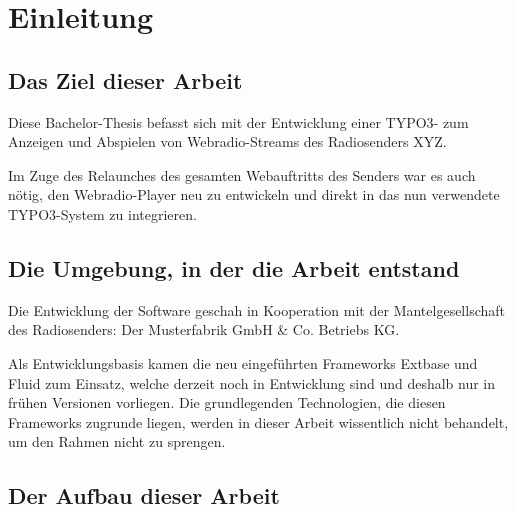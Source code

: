 
\chapter{Einleitung}
\label{cha:Einleitung}


\section{Das Ziel dieser Arbeit}
\label{sec:ZielDerArbeit}

Diese Bachelor-Thesis befasst sich mit der Entwicklung einer TYPO3- zum Anzeigen und Abspielen von Webradio-Streams des Radiosenders XYZ.

Im Zuge des Relaunches des gesamten Webauftritts des Senders war es auch n\"otig, den Webradio-Player neu zu entwickeln und direkt in das nun verwendete TYPO3-System zu integrieren.


\section{Die Umgebung, in der die Arbeit entstand}
\label{sec:EntstehungsUmgebungArbeit}

Die Entwicklung der Software geschah in Kooperation mit der Mantelgesellschaft des Radiosenders: Der Musterfabrik GmbH \& Co. Betriebs KG.

Als Entwicklungsbasis kamen die neu eingef\"uhrten Frameworks Extbase und Fluid zum Einsatz, welche derzeit noch in Entwicklung sind und deshalb nur in fr\"uhen Versionen vorliegen. Die grundlegenden Technologien, die diesen Frameworks zugrunde liegen, werden in dieser Arbeit wissentlich nicht behandelt, um den Rahmen nicht zu sprengen.


\section{Der Aufbau dieser Arbeit}
\label{sec:AufbauDieserArbeit}

